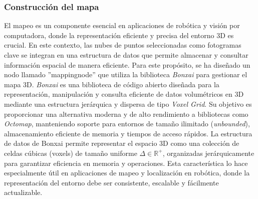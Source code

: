 \documentclass[12pt, a4paper, twoside]{article}
\begin{document}
\subsubsection{Construcción del mapa}
El mapeo es un componente esencial en aplicaciones de robótica y visión por computadora, donde la representación eficiente y precisa del entorno 3D es crucial.
En este contexto, las nubes de puntos seleccionadas como fotogramas clave se integran en una estructura de datos que permite almacenar y consultar información espacial 
de manera eficiente. Para este propósito, se ha diseñado un nodo llamado ''mapping\textunderscore node'' que utiliza la biblioteca \textit{Bonxai}\cite{faconti2024bonxai} para gestionar el mapa 3D.
\textit{Bonxai}\cite{faconti2024bonxai} es una biblioteca de código abierto diseñada para la representación, manipulación y consulta eficiente de datos volumétricos en 3D mediante una estructura 
jerárquica y dispersa de tipo \textit{Voxel Grid}. Su objetivo es proporcionar una alternativa moderna y de alto rendimiento a bibliotecas como \textit{Octomap}, 
manteniendo soporte para entornos de tamaño ilimitado (\textit{unbounded}), almacenamiento eficiente de memoria y tiempos de acceso rápidos.\newline
La estructura de datos de Bonxai\cite{faconti2024bonxai} permite representar el espacio 3D como una colección de celdas cúbicas (voxels) de tamaño uniforme \(\Delta \in \mathbb{R}^{+}\), 
organizadas jerárquicamente para garantizar eficiencia en memoria y operaciones. Esta característica lo hace especialmente útil en aplicaciones de mapeo y localización en robótica, 
donde la representación del entorno debe ser consistente, escalable y fácilmente actualizable.
\end{document}
